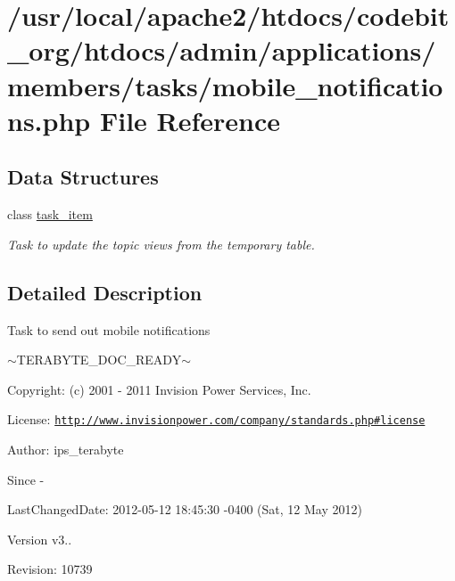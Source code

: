 \hypertarget{mobile__notifications_8php}{\section{/usr/local/apache2/htdocs/codebit\-\_\-org/htdocs/admin/applications/members/tasks/mobile\-\_\-notifications.php File Reference}
\label{mobile__notifications_8php}
}
\subsection*{Data Structures}
\begin{DoxyCompactItemize}
\item 
class \hyperlink{classtask__item}{task\-\_\-item}
\begin{DoxyCompactList}\small\item\em Task to update the topic views from the temporary table. \end{DoxyCompactList}\end{DoxyCompactItemize}


\subsection{Detailed Description}
\begin{DoxyVerb}  Task to send out mobile notifications
\end{DoxyVerb}
 $\sim$\-T\-E\-R\-A\-B\-Y\-T\-E\-\_\-\-D\-O\-C\-\_\-\-R\-E\-A\-D\-Y$\sim$ \begin{DoxyParagraph}{Copyright\-:}
(c) 2001 -\/ 2011 Invision Power Services, Inc.
\end{DoxyParagraph}
\begin{DoxyParagraph}{License\-:}
\href{http://www.invisionpower.com/company/standards.php#license}{\tt http\-://www.\-invisionpower.\-com/company/standards.\-php\#license}
\end{DoxyParagraph}
\begin{DoxyParagraph}{Author\-:}
ips\-\_\-terabyte 
\end{DoxyParagraph}
\begin{DoxySince}{Since}
-\/ 
\end{DoxySince}
\begin{DoxyParagraph}{Last\-Changed\-Date\-:}
2012-\/05-\/12 18\-:45\-:30 -\/0400 (Sat, 12 May 2012) 
\end{DoxyParagraph}
\begin{DoxyVersion}{Version}
v3.. 
\end{DoxyVersion}
\begin{DoxyParagraph}{Revision\-:}
10739 
\end{DoxyParagraph}
